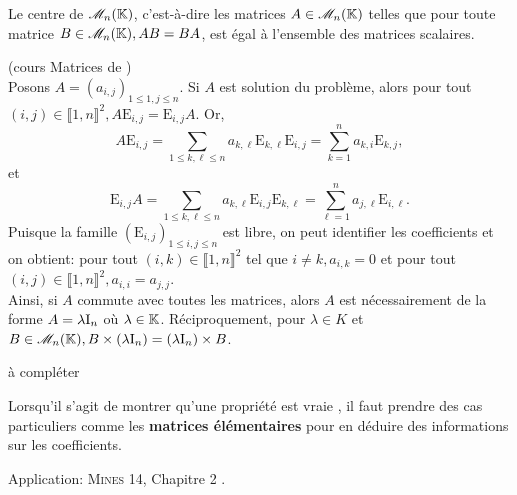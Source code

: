 \begin{tcolorbox}
Le centre de $\mathscr{M}_n(\mathbb{K})$, c'est-à-dire les matrices $A \in \mathscr{M}_n(\mathbb{K})$ telles que pour toute matrice $B \in \mathscr{M}_n(\mathbb{K}), AB = BA$, est égal à l'ensemble des matrices scalaires.
\end{tcolorbox}


\begin{preuve}
    (cours Matrices de \cite{maths-france})\\
    Posons $A = (a_{i,j})_{1 \leqslant 1, j \leqslant n}$. Si $A$ est solution du problème, alors pour tout $(i, j) \in \llbracket 1, n \rrbracket^2, A \mathrm{E}_{i,j} = \mathrm{E}_{i,j} A$. Or,
    $$A \mathrm{E}_{i,j} = \sum_{1 \leqslant k, \ell \leqslant n} a_{k, \ell} \mathrm{E}_{k,\ell} \mathrm{E}_{i,j} = \sum_{k=1}^{n} a_{k,i} \mathrm{E}_{k,j},$$
    et
    $$\mathrm{E}_{i,j} A = \sum_{1 \leqslant k, \ell \leqslant n} a_{k, \ell} \mathrm{E}_{i,j} \mathrm{E}_{k,\ell} = \sum_{\ell=1}^{n} a_{j,\ell} \mathrm{E}_{i,\ell}.$$
    Puisque la famille $(\mathrm{E}_{i, j})_{1 \leqslant i, j \leqslant n}$ est libre, on peut identifier les coefficients et on obtient: pour tout $(i, k) \in \llbracket 1, n \rrbracket^2$ tel que $i \not= k, a_{i,k}=0$ et pour tout $(i,j) \in \llbracket 1, n \rrbracket^2, a_{i,i}=a_{j,j}$. \\
    Ainsi, si $A$ commute avec toutes les matrices, alors $A$ est nécessairement de la forme $A = \lambda \mathrm{I}_n$ où $\lambda \in \mathbb{K}$. Réciproquement, pour $\lambda \in K$ et $B \in \mathscr{M}_n(\mathbb{K}), B \times (\lambda \mathrm{I}_n) = (\lambda \mathrm{I}_n) \times B$.
\end{preuve}

\begin{marginfigure}
à compléter
\end{marginfigure}

\begin{methode}
    Lorsqu'il s'agit de montrer qu'une propriété est vraie , il faut prendre des cas particuliers comme les \textbf{matrices élémentaires} pour en déduire des informations sur les coefficients.
\end{methode}

Application: \textsc{Mines 14}, Chapitre 2 \cite{exos_oraux}. 
